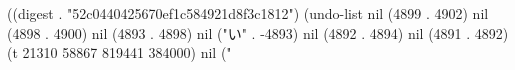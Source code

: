 
((digest . "52c0440425670ef1c584921d8f3c1812") (undo-list nil (4899 . 4902) nil (4898 . 4900) nil (4893 . 4898) nil ("い" . -4893) nil (4892 . 4894) nil (4891 . 4892) (t 21310 58867 819441 384000) nil ("%